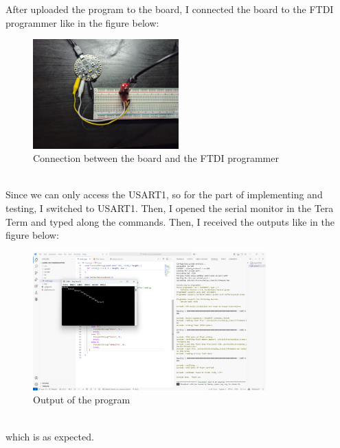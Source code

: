 \documentclass{article}
\begin{document}
After uploaded the program to the board, I connected the board to the FTDI programmer like in the figure below:
\begin{figure}[h]
    \centering
    \includegraphics[width=0.5\textwidth]{pic1.png}
    \caption{Connection between the board and the FTDI programmer}
\end{figure}\\
Since we can only access the USART1, so for the part of implementing and testing, I switched to USART1. Then, I opened the serial monitor in the Tera Term and typed along the commands. Then, I received the outputs like in the figure below:
\begin{figure}[h]
    \centering
    \includegraphics[width=0.8\textwidth]{pic2.png}
    \caption{Output of the program}
\end{figure} \\
which is as expected. 
\end{document}
